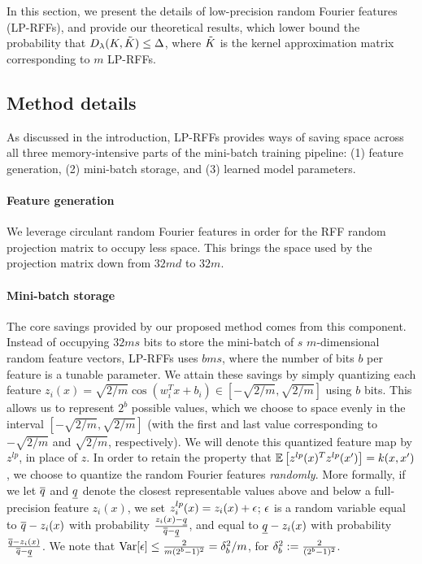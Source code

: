 In this section, we present the details of low-precision random Fourier features (LP-RFFs), and provide our theoretical results, which lower bound the probability that $D_{\lambda}(K,\tilde{K}) \leq \Delta$, where $\tilde{K}$ is the kernel approximation matrix corresponding to $m$ LP-RFFs.

\subsection{Method details}
As discussed in the introduction, LP-RFFs provides ways of saving space across all three memory-intensive parts of the mini-batch training pipeline: (1) feature generation, (2) mini-batch storage, and (3) learned model parameters.

\paragraph{Feature generation} We leverage circulant random Fourier features \citep{yu15} in order for the RFF random projection matrix to occupy less space. This brings the space used by the projection matrix down from $32md$ to $32m$.

\paragraph{Mini-batch storage} The core savings provided by our proposed method comes from this component.  Instead of occupying $32ms$ bits to store the mini-batch of $s$ $m$-dimensional random feature vectors, LP-RFFs uses $bms$, where the number of bits $b$ per feature is a tunable parameter.  We attain these savings by simply quantizing each feature $z_i(x) = \sqrt{2/m}\cos(w_i^T x + b_i) \in [-\sqrt{2/m},\sqrt{2/m}]$ using $b$ bits.  This allows us to represent $2^b$ possible values, which we choose to space evenly in the interval $[-\sqrt{2/m},\sqrt{2/m}]$ (with the first and last value corresponding to $-\sqrt{2/m}$ and $\sqrt{2/m}$, respectively). We will denote this quantized feature map by $z^{lp}$, in place of $z$. In order to retain the property that $\expect{}{z^{lp}(x)^T z^{lp}(x')} = k(x,x')$, we choose to quantize the random Fourier features \textit{randomly}.  More formally, if we let $\overline{q}$ and $\underline{q}$ denote the closest representable values above and below a full-precision feature $z_i(x)$, we set $z^{lp}_i(x) = z_i(x) + \epsilon$; $\epsilon$ is a random variable equal to $\overline{q} - z_i(x)$ with probability $\frac{z_i(x)-\underline{q}}{\overline{q}-\underline{q}}$, and equal to $\underline{q} - z_i(x)$ with probability $\frac{\overline{q}-z_i(x)}{\overline{q}-\underline{q}}$.  We note that ${\rm Var}[\epsilon] \leq \frac{2}{m(2^b-1)^2} = \delta_b^2/m$, for $\delta_b^2 := \frac{2}{(2^b-1)^2}$.


